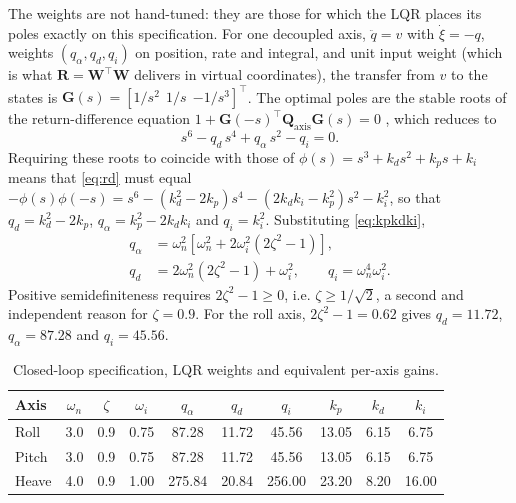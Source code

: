 \documentclass[]{IAC_style}
\newcommand{\W}{\bm{W}}
\begin{document}
The weights are not hand-tuned: they are those for which the LQR places its poles exactly on this specification. For one decoupled axis, $\ddot q=v$ with $\dot\xi=-q$, weights $(q_\alpha,q_d,q_i)$ on position, rate and integral, and unit input weight (which is what $\bm{R}=\W^\top\W$ delivers in virtual coordinates), the transfer from $v$ to the states is $\bm{G}(s)=[1/s^2\ \ 1/s\ \ {-1/s^3}]^\top$. The optimal poles are the stable roots of the return-difference equation $1+\bm{G}(-s)^\top\bm{Q}_\mathrm{axis}\bm{G}(s)=0$ \cite{kwakernaak1972}, which reduces to
\begin{equation}
s^6-q_d\,s^4+q_\alpha\,s^2-q_i=0 .
\label{eq:rd}
\end{equation}
Requiring these roots to coincide with those of $\phi(s)=s^3+k_ds^2+k_ps+k_i$ means that \eqref{eq:rd} must equal $-\phi(s)\phi(-s)=s^6-(k_d^2-2k_p)s^4-(2k_dk_i-k_p^2)s^2-k_i^2$, so that $q_d=k_d^2-2k_p$, $q_\alpha=k_p^2-2k_dk_i$ and $q_i=k_i^2$. Substituting \eqref{eq:kpkdki},
\begin{equation}
\begin{aligned}
q_\alpha&=\omega_n^2\left[\omega_n^2+2\omega_i^2(2\zeta^2-1)\right],\\
q_d&=2\omega_n^2(2\zeta^2-1)+\omega_i^2,\qquad q_i=\omega_n^4\omega_i^2 .
\end{aligned}
\label{eq:weights}
\end{equation}
Positive semidefiniteness requires $2\zeta^2-1\geq0$, i.e. $\zeta\geq1/\sqrt2$, a second and independent reason for $\zeta=0.9$. For the roll axis, $2\zeta^2-1=0.62$ gives $q_d=11.72$, $q_\alpha=87.28$ and $q_i=45.56$.

\begin{table}[H]
\centering
\caption{Closed-loop specification, LQR weights and equivalent per-axis gains.}
\label{tab:spec}
\footnotesize
\setlength{\tabcolsep}{3.2pt}
\begin{tabular}{@{}lccccccccc@{}}
\toprule
Axis & $\omega_n$ & $\zeta$ & $\omega_i$ & $q_\alpha$ & $q_d$ & $q_i$ & $k_p$ & $k_d$ & $k_i$\\
\midrule
Roll  & 3.0 & 0.9 & 0.75 & 87.28  & 11.72 & 45.56  & 13.05 & 6.15 & 6.75\\
Pitch & 3.0 & 0.9 & 0.75 & 87.28  & 11.72 & 45.56  & 13.05 & 6.15 & 6.75\\
Heave & 4.0 & 0.9 & 1.00 & 275.84 & 20.84 & 256.00 & 23.20 & 8.20 & 16.00\\
\bottomrule
\end{tabular}
\end{table}
\end{document}
